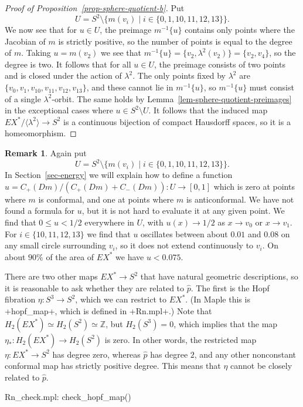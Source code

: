 \documentclass[reqno]{amsart}
\newcommand{\lm}        {\lambda}
\newcommand{\Z}         {{\mathbb{Z}}}
\newcommand{\ip}[1]     {\langle #1\rangle}
\newcommand{\st}        {\;|\;}
\newcommand{\sm}        {\setminus}
\newcommand{\hp}        {\widehat{p}}
\renewcommand{\:}{\colon}
\theoremstyle{definition}
\newtheorem{remark}[theorem]{Remark}
\begin{document}
\begin{proof}[Proof of Proposition~\ref{prop-sphere-quotient-b}]
 Put
 \[ U=S^2\sm\{m(v_i)\st i\in\{0,1,10,11,12,13\}\}. \]
 We now see that for $u\in U$, the preimage $m^{-1}\{u\}$ contains
 only points where the Jacobian of $m$ is strictly positive, so the
 number of points is equal to the degree of $m$.  Taking $u=m(v_2)$ we
 see that $m^{-1}\{u\}=\{v_2,\lm^2(v_2)\}=\{v_2,v_4\}$, so the degree
 is two.  It follows that for all $u\in U$, the preimage consists of
 two points and is closed under the action of $\lm^2$.  The only
 points fixed by $\lm^2$ are
 $\{v_0,v_1,v_{10},v_{11},v_{12},v_{13}\}$, and these cannot lie in
 $m^{-1}\{u\}$, so $m^{-1}\{u\}$ must consist of a single
 $\lm^2$-orbit.  The same holds by
 Lemma~\ref{lem-sphere-quotient-preimages} in the exceptional cases
 where $u\in S^2\sm U$.  It follows that the induced map
 $EX^*/\ip{\lm^2}\to S^2$ is a continuous bijection of compact
 Hausdorff spaces, so it is a homeomorphism.
\end{proof}

\begin{remark}
 Again put
 \[ U=S^2\sm\{m(v_i)\st i\in\{0,1,10,11,12,13\}\}. \]
 In Section~\ref{sec-energy} we will explain how to define a function
 $u=C_+(Dm)/(C_+(Dm)+C_-(Dm))\:U\to [0,1]$ which is zero at points
 where $m$ is conformal, and one at points where $m$ is anticonformal.
 We have not found a formula for $u$, but it is not hard to
 evaluate it at any given point.  We find that $0\leq u<1/2$
 everywhere in $U$, with $u(x)\to 1/2$ as $x\to v_0$ or $x\to v_1$.
 For $i\in\{10,11,12,13\}$ we find that $u$ oscillates between about
 $0.01$ and $0.08$ on any small circle surrounding $v_i$, so it does
 not extend continuously to $v_i$.  On about $90\%$ of the area of
 $EX^*$ we have $u < 0.075$.
\end{remark}

There are two other maps $EX^*\to S^2$ that have natural geometric
descriptions, so it is reasonable to ask whether they are related to
$\hp$.  The first is the Hopf fibration $\eta\:S^3\to S^2$, which we
can restrict to $EX^*$.  (In Maple this is \mcode+hopf_map+, which
is defined in \fname+Rn.mpl+.)  Note that $H_2(EX^*)\simeq
H_2(S^2)\simeq\Z$, but $H_2(S^3)=0$, which implies that the map
$\eta_*\:H_2(EX^*)\to H_2(S^2)$ is zero.  In other words, the
restricted map $\eta\:EX^*\to S^2$ has degree zero, whereas $\hp$ has
degree $2$, and any other nonconstant conformal map has strictly
positive degree.  This means that $\eta$ cannot be closely related to
$\hp$.
\begin{checks}
 Rn_check.mpl: check_hopf_map()
\end{checks}
\end{document}
